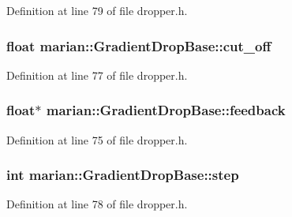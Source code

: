 Definition at line 79 of file dropper.\+h.

\subsubsection[{\texorpdfstring{cut\+\_\+off}{cut_off}}]{\setlength{\rightskip}{0pt plus 5cm}float marian\+::\+Gradient\+Drop\+Base\+::cut\+\_\+off\hspace{0.3cm}{\ttfamily [private]}}\hypertarget{classmarian_1_1GradientDropBase_ae0a2f7a33c37a512aae27cc064a76055}{}\label{classmarian_1_1GradientDropBase_ae0a2f7a33c37a512aae27cc064a76055}


Definition at line 77 of file dropper.\+h.

\subsubsection[{\texorpdfstring{feedback}{feedback}}]{\setlength{\rightskip}{0pt plus 5cm}float$\ast$ marian\+::\+Gradient\+Drop\+Base\+::feedback\hspace{0.3cm}{\ttfamily [private]}}\hypertarget{classmarian_1_1GradientDropBase_aba05eed3ccef8a7a9907265c5bb71113}{}\label{classmarian_1_1GradientDropBase_aba05eed3ccef8a7a9907265c5bb71113}


Definition at line 75 of file dropper.\+h.

\subsubsection[{\texorpdfstring{step}{step}}]{\setlength{\rightskip}{0pt plus 5cm}int marian\+::\+Gradient\+Drop\+Base\+::step\hspace{0.3cm}{\ttfamily [private]}}\hypertarget{classmarian_1_1GradientDropBase_acead9d9d021ef412b7e62776c96a5e51}{}\label{classmarian_1_1GradientDropBase_acead9d9d021ef412b7e62776c96a5e51}


Definition at line 78 of file dropper.\+h.

